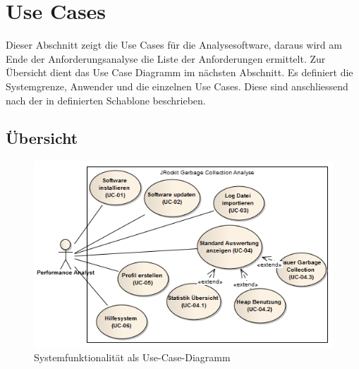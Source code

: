 \section{Use Cases}\label{use_cases}
Dieser Abschnitt zeigt die Use Cases für die Analysesoftware, daraus wird am Ende der Anforderungsanalyse die Liste der Anforderungen ermittelt. Zur Übersicht dient das Use Case Diagramm im nächsten Abschnitt. Es definiert die Systemgrenze, Anwender und die einzelnen Use Cases. Diese sind anschliessend nach der in \cite[S. 78-79]{pohl2010basiswissen} definierten Schablone beschrieben.
\subsection{Übersicht}\label{systemfunktionalitaet}
 \begin{figure}[H]
  	\centering
    	\includegraphics[width=14cm]{images/anforderungen_use-case}
        	\caption{Systemfunktionalität als Use-Case-Diagramm}
\end{figure}
